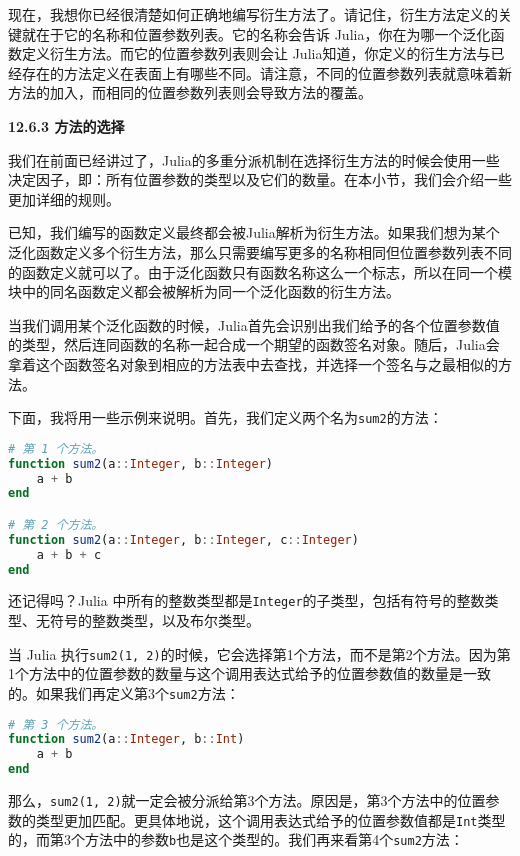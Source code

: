 现在，我想你已经很清楚如何正确地编写衍生方法了。请记住，衍生方法定义的关键就在于它的名称和位置参数列表。它的名称会告诉 Julia，你在为哪一个泛化函数定义衍生方法。而它的位置参数列表则会让 Julia知道，你定义的衍生方法与已经存在的方法定义在表面上有哪些不同。请注意，不同的位置参数列表就意味着新方法的加入，而相同的位置参数列表则会导致方法的覆盖。

\textbf{12.6.3 方法的选择}

我们在前面已经讲过了，Julia的多重分派机制在选择衍生方法的时候会使用一些决定因子，即：所有位置参数的类型以及它们的数量。在本小节，我们会介绍一些更加详细的规则。

已知，我们编写的函数定义最终都会被Julia解析为衍生方法。如果我们想为某个泛化函数定义多个衍生方法，那么只需要编写更多的名称相同但位置参数列表不同的函数定义就可以了。由于泛化函数只有函数名称这么一个标志，所以在同一个模块中的同名函数定义都会被解析为同一个泛化函数的衍生方法。

当我们调用某个泛化函数的时候，Julia首先会识别出我们给予的各个位置参数值的类型，然后连同函数的名称一起合成一个期望的函数签名对象。随后，Julia会拿着这个函数签名对象到相应的方法表中去查找，并选择一个签名与之最相似的方法。

下面，我将用一些示例来说明。首先，我们定义两个名为\verb`sum2`的方法：

\begin{lstlisting}[language=julia]
# 第 1 个方法。
function sum2(a::Integer, b::Integer)
    a + b
end

# 第 2 个方法。
function sum2(a::Integer, b::Integer, c::Integer)
    a + b + c
end
\end{lstlisting}

还记得吗？Julia 中所有的整数类型都是\verb`Integer`的子类型，包括有符号的整数类型、无符号的整数类型，以及布尔类型。

当 Julia 执行\verb`sum2(1, 2)`的时候，它会选择第1个方法，而不是第2个方法。因为第1个方法中的位置参数的数量与这个调用表达式给予的位置参数值的数量是一致的。如果我们再定义第3个\verb`sum2`方法：

\begin{lstlisting}[language=julia]
# 第 3 个方法。
function sum2(a::Integer, b::Int)
    a + b
end
\end{lstlisting}

那么，\verb`sum2(1, 2)`就一定会被分派给第3个方法。原因是，第3个方法中的位置参数的类型更加匹配。更具体地说，这个调用表达式给予的位置参数值都是\verb`Int`类型的，而第3个方法中的参数\verb`b`也是这个类型的。我们再来看第4个\verb`sum2`方法：

